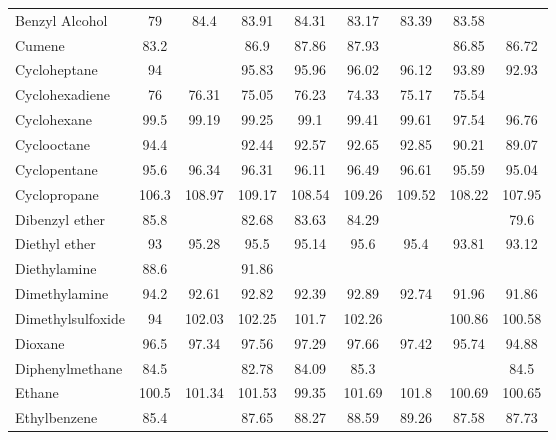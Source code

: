 \begin{longtable}{m{3.1cm} | c c c c c c c c}
 Benzyl Alcohol                 &    79 &   84.4 &     83.91 &  84.31 &   83.17 &    83.39 &  83.58 &         \\
 Cumene                         &  83.2 &        &      86.9 &  87.86 &   87.93 &          &  86.85 &   86.72 \\
 Cycloheptane                   &    94 &        &     95.83 &  95.96 &   96.02 &    96.12 &  93.89 &   92.93 \\
 Cyclohexadiene                 &    76 &  76.31 &     75.05 &  76.23 &   74.33 &    75.17 &  75.54 &         \\
 Cyclohexane                    &  99.5 &  99.19 &     99.25 &   99.1 &   99.41 &    99.61 &  97.54 &   96.76 \\
 Cyclooctane                    &  94.4 &        &     92.44 &  92.57 &   92.65 &    92.85 &  90.21 &   89.07 \\
 Cyclopentane                   &  95.6 &  96.34 &     96.31 &  96.11 &   96.49 &    96.61 &  95.59 &   95.04 \\
 Cyclopropane                   & 106.3 & 108.97 &    109.17 & 108.54 &  109.26 &   109.52 & 108.22 &  107.95 \\
 Dibenzyl ether                 &  85.8 &        &     82.68 &  83.63 &   84.29 &          &        &    79.6 \\
 Diethyl ether                  &    93 &  95.28 &      95.5 &  95.14 &    95.6 &     95.4 &  93.81 &   93.12 \\
 Diethylamine                   &  88.6 &        &     91.86 &        &         &          &        &         \\
 Dimethylamine                  &  94.2 &  92.61 &     92.82 &  92.39 &   92.89 &    92.74 &  91.96 &   91.86 \\
 Dimethylsulfoxide              &    94 & 102.03 &    102.25 &  101.7 &  102.26 &          & 100.86 &  100.58 \\
 Dioxane                        &  96.5 &  97.34 &     97.56 &  97.29 &   97.66 &    97.42 &  95.74 &   94.88 \\
 Diphenylmethane                &  84.5 &        &     82.78 &  84.09 &    85.3 &          &        &    84.5 \\
 Ethane                         & 100.5 & 101.34 &    101.53 &  99.35 &  101.69 &    101.8 & 100.69 &  100.65 \\
 Ethylbenzene                   &  85.4 &        &     87.65 &  88.27 &   88.59 &    89.26 &  87.58 &   87.73 \\

\end{longtable}
